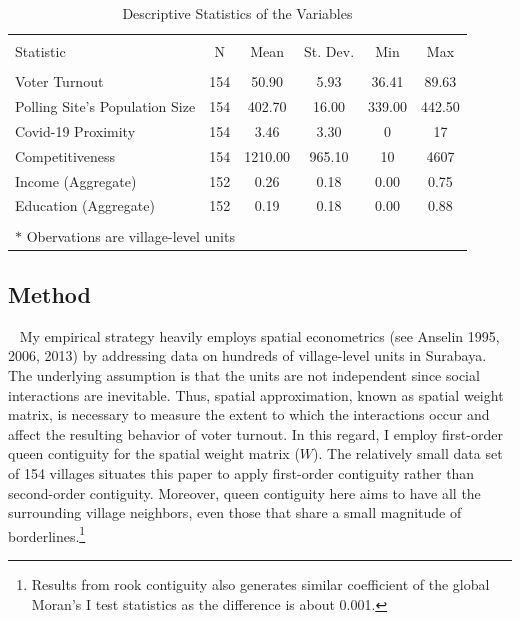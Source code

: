 \documentclass[
  12pt,
]{article}
\begin{document}
\normalsize
\begin{table}[!htbp] \centering 
  \caption{Descriptive Statistics of the Variables} 
  \label{} 
\small 
\begin{tabular}{@{\extracolsep{1pt}}lccccc} 
\\[-1.8ex]\hline \\[-1.8ex] 
Statistic & \multicolumn{1}{c}{N} & \multicolumn{1}{c}{Mean} & \multicolumn{1}{c}{St. Dev.} & \multicolumn{1}{c}{Min} & \multicolumn{1}{c}{Max} \\ 
\hline \\[-1.8ex] 
Voter Turnout & 154 & 50.90 & 5.93 & 36.41 & 89.63 \\ 
Polling Site's Population Size & 154 & 402.70 & 16.00 & 339.00 & 442.50 \\ 
Covid-19 Proximity & 154 & 3.46 & 3.30 & 0 & 17 \\ 
Competitiveness & 154 & 1210.00 & 965.10 & 10 & 4607 \\ 
Income (Aggregate) & 152 & 0.26 & 0.18 & 0.00 & 0.75 \\ 
Education (Aggregate) & 152 & 0.19 & 0.18 & 0.00 & 0.88 \\ 
\hline \\[-1.8ex] 
\multicolumn{6}{l}{$*$ Obervations are village-level units} \\ 
\end{tabular} 
\end{table} 
\normalsize

\hypertarget{method}{%
\subsection{Method}\label{method}}

~ My empirical strategy heavily employs spatial econometrics (see
Anselin 1995, 2006, 2013) by addressing data on hundreds of
village-level units in Surabaya. The underlying assumption is that the
units are not independent since social interactions are inevitable.
Thus, spatial approximation, known as spatial weight matrix, is
necessary to measure the extent to which the interactions occur and
affect the resulting behavior of voter turnout. In this regard, I employ
first-order queen contiguity for the spatial weight matrix (\(W\)). The
relatively small data set of 154 villages situates this paper to apply
first-order contiguity rather than second-order contiguity. Moreover,
queen contiguity here aims to have all the surrounding village
neighbors, even those that share a small magnitude of
borderlines.\footnote{Results from rook contiguity also generates
  similar coefficient of the global Moran's I test statistics as the
  difference is about 0.001.}
\end{document}
